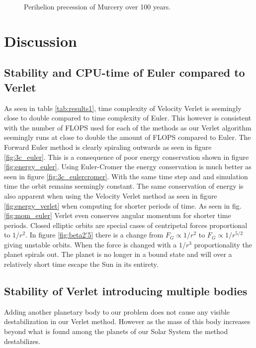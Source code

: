 \documentclass{emulateapj}
\begin{document}
\begin{figure}[t]
\mbox{}
\caption{Perihelion precession of Murcery over 100 years.}
\label{fig:perihelion}
\end{figure}

\section{Discussion}
\label{sec:discussion}
\subsection{Stability and CPU-time of Euler compared to Verlet}
%
As seen in table \ref{tab:results1}, time complexity of Velocity Verlet is seemingly close to double compared to time complexity of Euler. This however is consistent with the number of FLOPS used for each of the methods as our Verlet algorithm seemingly runs at close to double the amount of FLOPS compared to Euler.
%
The Forward Euler method is clearly spiraling outwards as seen in figure \ref{fig:3c_euler}. This is a consequence of poor energy conservation shown in figure \ref{fig:energy_euler}. Using Euler-Cromer the energy conservation is much better as seen in figure \ref{fig:3c_eulercromer}. With the same time step and and simulation time the orbit remains seemingly constant. The same conservation of energy is also apparent when using the Velocity Verlet method as seen in figure \ref{fig:energy_verlet} when computing for shorter periods of time. As seen in fig.\ref{fig:mom_euler} Verlet even conserves angular momentum for shorter time periods.
%
Closed elliptic orbits are special cases of centripetal forces proportional to $1/r^2$. In figure \ref{fig:beta2'5} there is a change from $F_G \propto 1/r^2$ to $F_G \propto 1/r^{5/2}$ giving unstable orbits. When the force is changed with a $1/r^3$ proportionality the planet spirals out. The planet is no longer in a bound state and will over a relatively short time escape the Sun in its entirety.  


\subsection{Stability of Verlet introducing multiple bodies}

Adding another planetary body to our problem does not cause any visible destabilization in our Verlet method. However as the mass of this body increases beyond what is found among the planets of our Solar System the method destabilizes.
\end{document}
